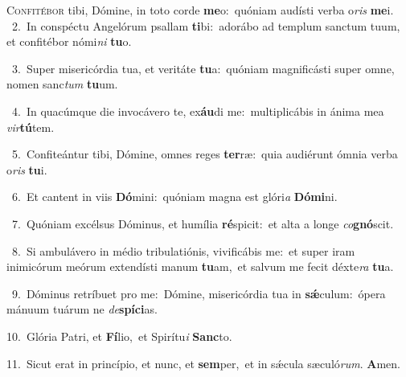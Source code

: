\lettrine{\initial\textcolor{\initialcolor}{C}}{onfitébor} tibi, Dómine, in toto corde \textbf{me}\-o:~\star quóniam audísti verba o\textit{ris} \textbf{me}\-i.\\
{\numbfont\textcolor{\numbcolor}{~2.}}~In conspéctu Angelórum psallam \textbf{ti}\-bi:~\star adorábo ad templum sanctum tuum, et confitébor nómi\textit{ni} \textbf{tu}\-o.\par
{\numbfont\textcolor{\numbcolor}{~3.}}~Super misericórdia tua, et veritáte \textbf{tu}\-a:~\star quóniam magnificásti super omne, nomen sanc\textit{tum} \textbf{tu}\-um.\par
{\numbfont\textcolor{\numbcolor}{~4.}}~In quacúmque die invocávero te, ex\-\textbf{áu}\-di me:~\star multiplicábis in ánima mea \textit{vir}\-\textbf{tú}tem.\par
{\numbfont\textcolor{\numbcolor}{~5.}}~Confiteántur tibi, Dómine, omnes reges \textbf{ter}\-ræ:~\star quia audiérunt ómnia verba o\textit{ris} \textbf{tu}\-i.\par
{\numbfont\textcolor{\numbcolor}{~6.}}~Et cantent in viis \textbf{Dó}\-mini:~\star quóniam magna est glóri\textit{a} \textbf{Dó}\-\textbf{mi}ni.\par
{\numbfont\textcolor{\numbcolor}{~7.}}~Quóniam excélsus Dóminus, et humília \textbf{ré}\-spicit:~\star et alta a longe \textit{co}\-\textbf{gnó}scit.\par
{\numbfont\textcolor{\numbcolor}{~8.}}~Si ambulávero in médio tribulatiónis, vivificábis me:~\dagger et super iram inimicórum meórum extendísti manum \textbf{tu}\-am,~\star et salvum me fecit déxte\textit{ra} \textbf{tu}\-a.\par
{\numbfont\textcolor{\numbcolor}{~9.}}~Dóminus retríbuet pro me:~\dagger Dómine, misericórdia tua in \textbf{sǽ}\-culum:~\star ópera mánuum tuárum ne \textit{de}\-\textbf{spí}\textbf{ci}as.\par
{\numbfont\textcolor{\numbcolor}{10.}}~Glória Patri, et \textbf{Fí}\-lio,~\star et Spirítu\textit{i} \textbf{Sanc}\-to.\par
{\numbfont\textcolor{\numbcolor}{11.}}~Sicut erat in princípio, et nunc, et \textbf{sem}\-per,~\star et in sǽcula sæculó\-\textit{rum}\-. \textbf{A}\-men.\par
